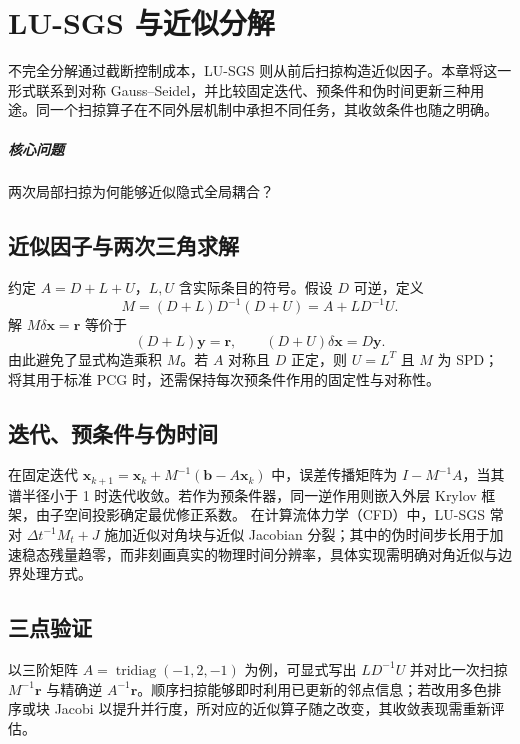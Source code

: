 \chapter{LU-SGS 与近似分解}\label{v0ch:9}
\begin{chaptersummary}
不完全分解通过截断控制成本，LU-SGS 则从前后扫掠构造近似因子。本章将这一形式联系到对称 Gauss--Seidel，并比较固定迭代、预条件和伪时间更新三种用途。同一个扫掠算子在不同外层机制中承担不同任务，其收敛条件也随之明确。
\end{chaptersummary}
\paragraph{核心问题}两次局部扫掠为何能够近似隐式全局耦合？

\section{近似因子与两次三角求解}
约定 $A=D+L+U$，$L,U$ 含实际条目的符号。假设 $D$ 可逆，定义
\[
 M=(D+L)D^{-1}(D+U)
   =A+LD^{-1}U.
\]
解 $M\delta\bm x=\bm r$ 等价于
\[
 (D+L)\bm y=\bm r,\qquad
 (D+U)\delta\bm x=D\bm y.
\]
由此避免了显式构造乘积 $M$。若 $A$ 对称且 $D$ 正定，则 $U=L^T$ 且 $M$ 为 SPD；将其用于标准 PCG 时，还需保持每次预条件作用的固定性与对称性。
\section{迭代、预条件与伪时间}
在固定迭代 $\bm x_{k+1}=\bm x_k+M^{-1}(\bm b-A\bm x_k)$ 中，误差传播矩阵为 $I-M^{-1}A$，当其谱半径小于 1 时迭代收敛。若作为预条件器，同一逆作用则嵌入外层 Krylov 框架，由子空间投影确定最优修正系数。
在计算流体力学（CFD）中，LU-SGS 常对 $\Delta t^{-1}M_t+J$ 施加近似对角块与近似 Jacobian 分裂；其中的伪时间步长用于加速稳态残量趋零，而非刻画真实的物理时间分辨率，具体实现需明确对角近似与边界处理方式。
\section{三点验证}
以三阶矩阵 $A=\operatorname{tridiag}(-1,2,-1)$ 为例，可显式写出 $LD^{-1}U$ 并对比一次扫掠 $M^{-1}\bm r$ 与精确逆 $A^{-1}\bm r$。顺序扫掠能够即时利用已更新的邻点信息；若改用多色排序或块 Jacobi 以提升并行度，所对应的近似算子随之改变，其收敛表现需重新评估。
